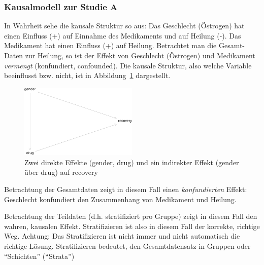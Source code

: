 \documentclass[
  a4paper,
  DIV=11]{scrreprt}
\theoremstyle{definition}
\theoremstyle{remark}
\begin{document}
\hypertarget{kausalmodell-zur-studie-a}{%
\subsubsection{Kausalmodell zur Studie
A}\label{kausalmodell-zur-studie-a}}

In Wahrheit sehe die kausale Struktur so aus: Das Geschlecht (Östrogen)
hat einen Einfluss (+) auf Einnahme des Medikaments und auf Heilung (-).
Das Medikament hat einen Einfluss (+) auf Heilung. Betrachtet man die
Gesamt-Daten zur Heilung, so ist der Effekt von Geschlecht (Östrogen)
und Medikament \emph{vermengt} (konfundiert, confounded). Die kausale
Struktur, also welche Variable beeinflusst bzw. nicht, ist in
Abbildung~\ref{fig-dag-studie-a} dargestellt.

\begin{figure}

{\centering \includegraphics[width=0.5\textwidth,height=\textheight]{./kausal_files/figure-pdf/fig-dag-studie-a-1.pdf}

}

\caption{\label{fig-dag-studie-a}Zwei direkte Effekte (gender, drug) und
ein indirekter Effekt (gender über drug) auf recovery}

\end{figure}

Betrachtung der Gesamtdaten zeigt in diesem Fall einen
\emph{konfundierten} Effekt: Geschlecht konfundiert den Zusammenhang von
Medikament und Heilung.

\begin{tcolorbox}[enhanced jigsaw, left=2mm, colframe=quarto-callout-important-color-frame, opacityback=0, arc=.35mm, rightrule=.15mm, breakable, toptitle=1mm, colbacktitle=quarto-callout-important-color!10!white, colback=white, coltitle=black, bottomrule=.15mm, titlerule=0mm, opacitybacktitle=0.6, bottomtitle=1mm, title=\textcolor{quarto-callout-important-color}{\faExclamation}\hspace{0.5em}{Wichtig}, toprule=.15mm, leftrule=.75mm]
Betrachtung der Teildaten (d.h. stratifiziert pro Gruppe) zeigt in
diesem Fall den wahren, kausalen Effekt. Stratifizieren ist also in
diesem Fall der korrekte, richtige Weg. Achtung: Das Stratifizieren ist
nicht immer und nicht automatisch die richtige Lösung. Stratifizieren
bedeutet, den Gesamtdatensatz in Gruppen oder ``Schichten'' (``Strata'')
\end{tcolorbox}
\end{document}
